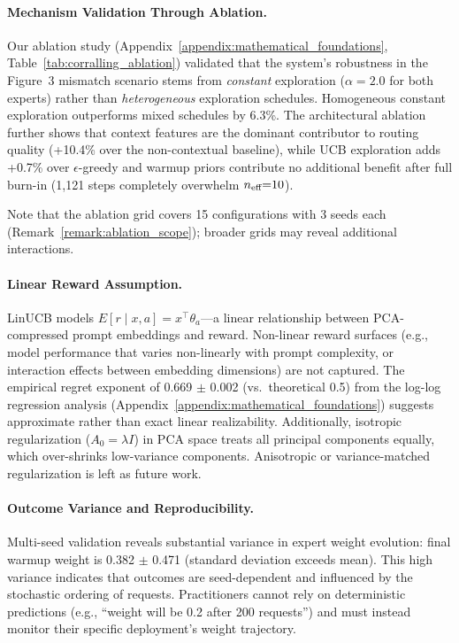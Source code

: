 \paragraph{Mechanism Validation Through Ablation.}
Our ablation study (Appendix~\ref{appendix:mathematical_foundations},
Table~\ref{tab:corralling_ablation}) validated that the system's robustness
in the Figure~3 mismatch scenario stems from \emph{constant} exploration
($\alpha{=}2.0$ for both experts) rather than \emph{heterogeneous} exploration
schedules.
Homogeneous constant exploration outperforms mixed schedules by 6.3\%.
The architectural ablation further shows that context features are the dominant
contributor to routing quality (+10.4\% over the non-contextual baseline),
while UCB exploration adds +0.7\% over $\epsilon$-greedy and warmup priors
contribute no additional benefit after full burn-in (1,121 steps completely
overwhelm $n_{\text{eff}}{=}10$).

Note that the ablation grid covers 15 configurations with 3 seeds each
(Remark~\ref{remark:ablation_scope}); broader grids may reveal additional
interactions.

\paragraph{Linear Reward Assumption.}
LinUCB models $E[r \mid x, a] = x^\top \theta_a$---a linear relationship
between PCA-compressed prompt embeddings and reward.
Non-linear reward surfaces (e.g., model performance that varies non-linearly
with prompt complexity, or interaction effects between embedding dimensions)
are not captured.
The empirical regret exponent of 0.669 $\pm$ 0.002 (vs.\ theoretical 0.5)
from the log-log regression analysis
(Appendix~\ref{appendix:mathematical_foundations}) suggests approximate
rather than exact linear realizability.
Additionally, isotropic regularization ($A_0 = \lambda I$) in PCA space treats
all principal components equally, which over-shrinks low-variance components.
Anisotropic or variance-matched regularization is left as future work.

\paragraph{Outcome Variance and Reproducibility.}
Multi-seed validation reveals substantial variance in expert weight evolution:
final warmup weight is 0.382 $\pm$ 0.471 (standard deviation exceeds mean).
This high variance indicates that outcomes are seed-dependent and influenced
by the stochastic ordering of requests.
Practitioners cannot rely on deterministic predictions (e.g., ``weight will be
0.2 after 200 requests'') and must instead monitor their specific deployment's
weight trajectory.

